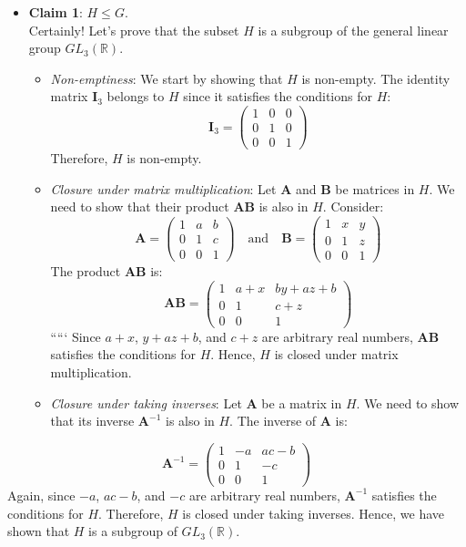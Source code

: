 \documentclass[
]{book}
\theoremstyle{definition}
\theoremstyle{definition}
\theoremstyle{definition}
\theoremstyle{definition}
\theoremstyle{remark}
\begin{document}
\begin{itemize}
\item
  \textbf{Claim 1}: \(H \leq G\).\\
  Certainly! Let's prove that the subset \(H\) is a subgroup of the general linear group \(GL_3(\mathbb{R})\).

  \begin{itemize}
  \item
    \emph{Non-emptiness}: We start by showing that \(H\) is non-empty. The identity matrix \(\mathbf{I}_3\) belongs to \(H\) since it satisfies the conditions for \(H\):
    \[ \mathbf{I}_3 = \begin{pmatrix} 1 & 0 & 0 \\ 0 & 1 & 0 \\ 0 & 0 & 1 \end{pmatrix} \]
    Therefore, \(H\) is non-empty.
  \item
    \emph{Closure under matrix multiplication}: Let \(\mathbf{A}\) and \(\mathbf{B}\) be matrices in \(H\). We need to show that their product \(\mathbf{AB}\) is also in \(H\). Consider:
    \[ \mathbf{A} = \begin{pmatrix} 1 & a & b \\ 0 & 1 & c \\ 0 & 0 & 1 \end{pmatrix} \quad \text{and} \quad \mathbf{B} = \begin{pmatrix} 1 & x & y \\ 0 & 1 & z \\ 0 & 0 & 1 \end{pmatrix} \]
    The product \(\mathbf{AB}\) is:
    \[ \mathbf{AB} = \begin{pmatrix} 1 & a+x & by+az+b \\ 0 & 1 & c+z \\ 0 & 0 & 1 \end{pmatrix} \] `````
    Since \(a+x\), \(y+az+b\), and \(c+z\) are arbitrary real numbers, \(\mathbf{AB}\) satisfies the conditions for \(H\). Hence, \(H\) is closed under matrix multiplication.
  \item
    \emph{Closure under taking inverses}: Let \(\mathbf{A}\) be a matrix in \(H\). We need to show that its inverse \(\mathbf{A}^{-1}\) is also in \(H\). The inverse of \(\mathbf{A}\) is:
  \end{itemize}
\end{itemize}

\[ \mathbf{A}^{-1} = \begin{pmatrix} 1 & -a & ac-b \\ 0 & 1 & -c \\ 0 & 0 & 1 \end{pmatrix} \]
Again, since \(-a\), \(ac-b\), and \(-c\) are arbitrary real numbers, \(\mathbf{A}^{-1}\) satisfies the conditions for \(H\). Therefore, \(H\) is closed under taking inverses.
Hence, we have shown that \(H\) is a subgroup of \(GL_3(\mathbb{R})\).
\end{document}
